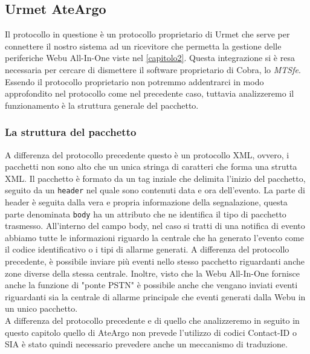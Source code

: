 \subsection{Urmet AteArgo}
Il protocollo in questione è un protocollo proprietario di Urmet che serve per connettere il nostro sistema ad un ricevitore che permetta la gestione delle periferiche Webu All-In-One viste nel \chaptername \ref{capitolo2}. Questa integrazione si è resa necessaria per cercare di dismettere il software proprietario di Cobra, lo \emph{MTSfe}.\\
Essendo il protocollo proprietario non potremmo addentrarci in modo approfondito nel protocollo come nel precedente caso, tuttavia analizzeremo il funzionamento è la struttura generale del pacchetto.
\subsubsection{La struttura del pacchetto}
A differenza del protocollo precedente questo è un protocollo XML, ovvero, i pacchetti non sono alto che un unica stringa di caratteri che forma una strutta XML.
Il pacchetto è formato da un tag inziale che delimita l'inizio del pacchetto, seguito da un \texttt{header} nel quale sono contenuti data e ora dell'evento. La parte di header è seguita dalla vera e propria informazione della segnalazione, questa parte denominata \texttt{body} ha un attributo che ne identifica il tipo di pacchetto trasmesso. All'interno del campo body, nel caso si tratti di una notifica di evento abbiamo tutte le informazioni riguardo la centrale che ha generato l'evento come il codice identificativo o i tipi di allarme generati. A differenza del protocollo precedente, è possibile inviare più eventi nello stesso pacchetto riguardanti anche zone diverse della stessa centrale. Inoltre, visto che la Webu All-In-One fornisce anche la funzione di "ponte PSTN" è possibile anche che vengano inviati eventi riguardanti sia la centrale di allarme principale che eventi generati dalla Webu in un unico pacchetto.\\
A differenza del protocollo precedente e di quello che analizzeremo in seguito in questo capitolo quello di AteArgo non prevede l'utilizzo di codici Contact-ID o SIA è stato quindi necessario prevedere anche un meccanismo di traduzione.
